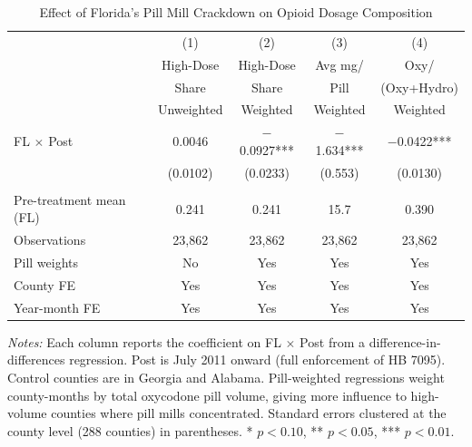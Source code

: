 \begin{table}[H]
\centering
\caption{Effect of Florida's Pill Mill Crackdown on Opioid Dosage Composition}
\label{tab:main}
\begin{threeparttable}
\begin{tabular}{lcccc}
\toprule
 & (1) & (2) & (3) & (4) \\
 & High-Dose & High-Dose & Avg mg/ & Oxy/ \\
 & Share & Share & Pill & (Oxy+Hydro) \\
 & Unweighted & Weighted & Weighted & Weighted \\
\midrule
FL $\times$ Post & 0.0046 & $-$0.0927*** & $-$1.634*** & $-$0.0422*** \\
 & (0.0102) & (0.0233) & (0.553) & (0.0130) \\
\\
Pre-treatment mean (FL) & 0.241 & 0.241 & 15.7 & 0.390 \\
Observations & 23,862 & 23,862 & 23,862 & 23,862 \\
Pill weights & No & Yes & Yes & Yes \\
County FE & Yes & Yes & Yes & Yes \\
Year-month FE & Yes & Yes & Yes & Yes \\
\bottomrule
\end{tabular}
\begin{tablenotes}[flushleft]
\small
\item \textit{Notes:} Each column reports the coefficient on FL $\times$ Post from a difference-in-differences regression. Post is July 2011 onward (full enforcement of HB 7095). Control counties are in Georgia and Alabama. Pill-weighted regressions weight county-months by total oxycodone pill volume, giving more influence to high-volume counties where pill mills concentrated. Standard errors clustered at the county level (288 counties) in parentheses. * $p<0.10$, ** $p<0.05$, *** $p<0.01$.
\end{tablenotes}
\end{threeparttable}
\end{table}
